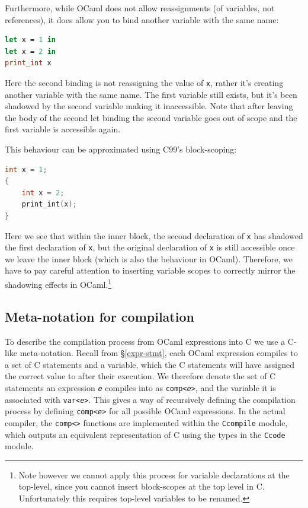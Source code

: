 Furthermore, while OCaml does not allow reassignments (of variables, not 
references), it does allow you to bind another variable with the same name:

\begin{lstlisting}[language=Caml]
let x = 1 in
let x = 2 in
print_int x
\end{lstlisting} 

Here the second binding is not reassigning the value of \texttt{x}, rather it's 
creating another variable with the same name. The first variable still exists, 
but it's been shadowed by the second variable making it inaccessible. Note that 
after leaving the body of the second let binding the second variable goes out 
of scope and the first variable is accessible again.

This behaviour can be approximated using C99's block-scoping:

\begin{lstlisting}[language=C]
int x = 1;
{
    int x = 2;
    print_int(x);
}
\end{lstlisting}

Here we see that within the inner block, the second declaration of \texttt{x}
has shadowed the first declaration of \texttt{x}, but the original declaration
of \texttt{x} is still accessible once we leave the inner block (which is also
the behaviour in OCaml). Therefore, we have to pay careful attention to
inserting variable scopes to correctly mirror the shadowing effects in
OCaml.\footnote{Note however we cannot apply this process for variable
    declarations at the top-level, since you cannot insert block-scopes at the
    top level in C. Unfortunately this requires top-level variables to be
renamed.}

\subsection{Meta-notation for compilation}\label{meta-notation}

To describe the compilation process from OCaml expressions into C we use a
C-like meta-notation. Recall from \S\ref{expr-stmt}, each OCaml expression
compiles to a set of C statements and a variable, which the C statements will
have assigned the correct value to after their execution. We therefore denote
the set of C statements an expression \textit{\texttt{e}} compiles into as
\texttt{comp<\textit{e}>}, and the variable it is associated with
\texttt{var<\textit{e}>}. This gives a way of recursively defining the
compilation process by defining \texttt{comp<\textit{e}>} for all possible OCaml
expressions. In the actual compiler, the \texttt{comp<>} functions are
implemented within the \texttt{Ccompile} module, which outputs an equivalent
representation of C using the types in the \texttt{Ccode} module.

